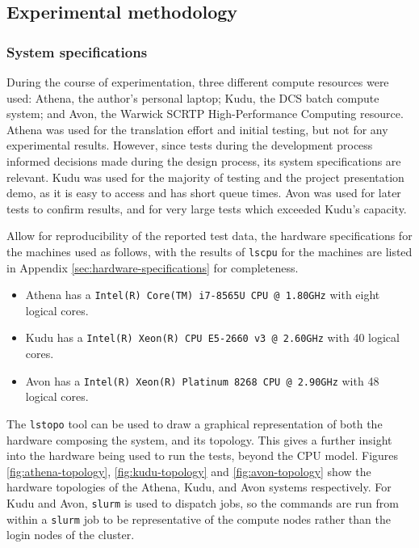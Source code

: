 \subsection{Experimental methodology}
\label{ssec:experimental-methodology}


\subsubsection{System specifications}
\label{sssec:system-specifications}

During the course of experimentation, three different compute resources were used: Athena, the author's personal laptop; Kudu, the DCS batch compute system; and Avon, the Warwick SCRTP High-Performance Computing resource. Athena was used for the translation effort and initial testing, but not for any experimental results. However, since tests during the development process informed decisions made during the design process, its system specifications are relevant. Kudu was used for the majority of testing and the project presentation demo, as it is easy to access and has short queue times. Avon was used for later tests to confirm results, and for very large tests which exceeded Kudu's capacity.

Allow for reproducibility of the reported test data, the hardware specifications for the machines used as follows, with the results of \texttt{lscpu} for the machines are listed in Appendix \ref{sec:hardware-specifications} for completeness.

\begin{itemize}
    \item Athena has a \texttt{Intel(R) Core(TM) i7-8565U CPU @ 1.80GHz} with eight logical cores.
    \item Kudu has a \texttt{Intel(R) Xeon(R) CPU E5-2660 v3 @ 2.60GHz} with 40 logical cores.
    \item Avon has a \texttt{Intel(R) Xeon(R) Platinum 8268 CPU @ 2.90GHz} with 48 logical cores.
\end{itemize}

The \texttt{lstopo} tool can be used to draw a graphical representation of both the hardware composing the system, and its topology. This gives a further insight into the hardware being used to run the tests, beyond the CPU model. Figures \ref{fig:athena-topology}, \ref{fig:kudu-topology} and \ref{fig:avon-topology} show the hardware topologies of the Athena, Kudu, and Avon systems respectively. For Kudu and Avon, \texttt{slurm} is used to dispatch jobs, so the commands are run from within a \texttt{slurm} job to be representative of the compute nodes rather than the login nodes of the cluster.

